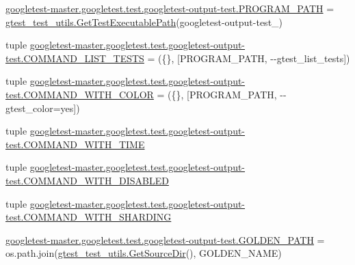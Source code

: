\begin{DoxyCompactItemize}
\mbox{\hyperlink{namespacegoogletest-master_1_1googletest_1_1test_1_1googletest-output-test_adf02ad1211aa7490cfa528d2122115a5}{googletest-\/master.\+googletest.\+test.\+googletest-\/output-\/test.\+P\+R\+O\+G\+R\+A\+M\+\_\+\+P\+A\+TH}} = \mbox{\hyperlink{namespacegtest__test__utils_a89ed3717984a80ffbb7a9c92f71b86a2}{gtest\+\_\+test\+\_\+utils.\+Get\+Test\+Executable\+Path}}(\textquotesingle{}googletest-\/output-\/test\+\_\+\textquotesingle{})
\item 
tuple \mbox{\hyperlink{namespacegoogletest-master_1_1googletest_1_1test_1_1googletest-output-test_a75e033931a0e3f81ecd77fbbcee0ed50}{googletest-\/master.\+googletest.\+test.\+googletest-\/output-\/test.\+C\+O\+M\+M\+A\+N\+D\+\_\+\+L\+I\+S\+T\+\_\+\+T\+E\+S\+TS}} = (\{\}, \mbox{[}P\+R\+O\+G\+R\+A\+M\+\_\+\+P\+A\+TH, \textquotesingle{}-\/-\/gtest\+\_\+list\+\_\+tests\textquotesingle{}\mbox{]})
\item 
tuple \mbox{\hyperlink{namespacegoogletest-master_1_1googletest_1_1test_1_1googletest-output-test_a374ad595e6794f255772251c2377ad35}{googletest-\/master.\+googletest.\+test.\+googletest-\/output-\/test.\+C\+O\+M\+M\+A\+N\+D\+\_\+\+W\+I\+T\+H\+\_\+\+C\+O\+L\+OR}} = (\{\}, \mbox{[}P\+R\+O\+G\+R\+A\+M\+\_\+\+P\+A\+TH, \textquotesingle{}-\/-\/gtest\+\_\+color=yes\textquotesingle{}\mbox{]})
\item 
tuple \mbox{\hyperlink{namespacegoogletest-master_1_1googletest_1_1test_1_1googletest-output-test_aa75ecbcea5f95c052d6dadf82c86b5f2}{googletest-\/master.\+googletest.\+test.\+googletest-\/output-\/test.\+C\+O\+M\+M\+A\+N\+D\+\_\+\+W\+I\+T\+H\+\_\+\+T\+I\+ME}}
\item 
tuple \mbox{\hyperlink{namespacegoogletest-master_1_1googletest_1_1test_1_1googletest-output-test_a538a1c0f179b9b28b7dab5f91a009eaf}{googletest-\/master.\+googletest.\+test.\+googletest-\/output-\/test.\+C\+O\+M\+M\+A\+N\+D\+\_\+\+W\+I\+T\+H\+\_\+\+D\+I\+S\+A\+B\+L\+ED}}
\item 
tuple \mbox{\hyperlink{namespacegoogletest-master_1_1googletest_1_1test_1_1googletest-output-test_aa9e69c23bb24f0e91a08d12c035c252a}{googletest-\/master.\+googletest.\+test.\+googletest-\/output-\/test.\+C\+O\+M\+M\+A\+N\+D\+\_\+\+W\+I\+T\+H\+\_\+\+S\+H\+A\+R\+D\+I\+NG}}
\item 
\mbox{\hyperlink{namespacegoogletest-master_1_1googletest_1_1test_1_1googletest-output-test_ab0041b00c5cd02be70d08c0b84ecf67f}{googletest-\/master.\+googletest.\+test.\+googletest-\/output-\/test.\+G\+O\+L\+D\+E\+N\+\_\+\+P\+A\+TH}} = os.\+path.\+join(\mbox{\hyperlink{namespacegtest__test__utils_aaff66cb0980804d8bd57dc719d4b5518}{gtest\+\_\+test\+\_\+utils.\+Get\+Source\+Dir}}(), G\+O\+L\+D\+E\+N\+\_\+\+N\+A\+ME)

\end{DoxyCompactItemize}
